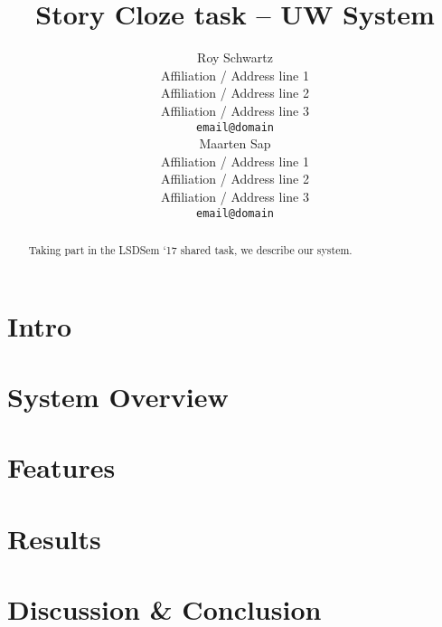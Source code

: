 \documentclass[11pt]{article}
\title{Story Cloze task -- UW System}
\author{Roy Schwartz\\
  Affiliation / Address line 1 \\
  Affiliation / Address line 2 \\
  Affiliation / Address line 3 \\
  {\tt email@domain} \\\And	
  Maarten Sap \\
  Affiliation / Address line 1 \\
  Affiliation / Address line 2 \\
  Affiliation / Address line 3 \\
  {\tt email@domain} \\}
\date{}
\begin{document}
\maketitle
\begin{abstract}
Taking part in the LSDSem `17 shared task, we describe our system.

\end{abstract}

\section{Intro}

\section{System Overview}

\section{Features}

\section{Results}

\section{Discussion \& Conclusion}



\end{document}
